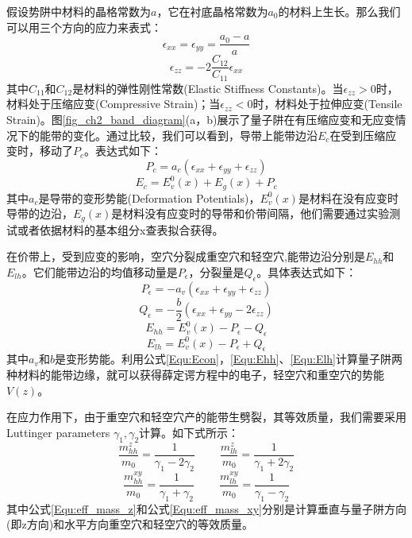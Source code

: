 假设势阱中材料的晶格常数为$a$，它在衬底晶格常数为$a_{0}$的材料上生长。那么我们可以用三个方向的应力来表式：
\begin{equation}
\label{Equ:exx}
\epsilon_{xx} = \epsilon_{yy} = \frac{a_{0}-a}{a}
\end{equation}
\begin{equation}
\label{Equ:ezz}
\epsilon_{zz} = -2\frac{C_{12}}{C_{11}}\epsilon_{xx}
\end{equation}
其中$C_{11}$和$C_{12}$是材料的弹性刚性常数(Elastic Stiffness Constants)。当$\epsilon_{zz}>0$时，材料处于压缩应变(Compressive Strain)；当$\epsilon_{zz}<0$时，材料处于拉伸应变(Tensile Strain)。图\ref{fig_ch2_band_diagram}(a，b)展示了量子阱在有压缩应变和无应变情况下的能带的变化。通过比较，我们可以看到，导带上能带边沿$E_c$在受到压缩应变时，移动了$P_{c}$。表达式如下：
\begin{equation}
\label{Equ:Pc}
P_{c} = a_{c}(\epsilon_{xx}+\epsilon_{yy}+\epsilon_{zz})
\end{equation}
\begin{equation}
\label{Equ:Econ}
E_{c} = E_{v}^{0}(x)+E_{g}(x)+P_{c}
\end{equation}
其中$a_{c}$是导带的变形势能(Deformation Potentials)，$E_v^0(x)$是材料在没有应变时导带的边沿，$E_{g}(x)$是材料没有应变时的导带和价带间隔，他们需要通过实验测试或者依据材料的基本组分x查表拟合获得\cite{chuang1995physics,li2000material}。

在价带上，受到应变的影响，空穴分裂成重空穴和轻空穴,能带边沿分别是$E_{hh}$和$E_{lh}$。它们能带边沿的均值移动量是$P_{\epsilon}$，分裂量是$Q_{\epsilon}$。具体表达式如下：
\begin{equation}
\label{Equ:Pe}
P_{\epsilon} = -a_{v}(\epsilon_{xx}+\epsilon_{yy}+\epsilon_{zz})
\end{equation}
\begin{equation}
\label{Equ:Qe}
Q_{\epsilon} = -\frac{b}{2}(\epsilon_{xx}+\epsilon_{yy}-2\epsilon_{zz})
\end{equation}
\begin{equation}
\label{Equ:Ehh}
E_{hh} = E_{v}^{0}(x)-P_{\epsilon}-Q_{\epsilon}
\end{equation}
\begin{equation}
\label{Equ:Elh}
E_{lh} = E_{v}^{0}(x)-P_{\epsilon}+Q_{\epsilon}
\end{equation}
其中$a_{v}$和$b$是变形势能。利用公式\ref{Equ:Econ}，\ref{Equ:Ehh}、\ref{Equ:Elh}计算量子阱两种材料的能带边缘，就可以获得薛定谔方程中的电子，轻空穴和重空穴的势能$V(z)$。

在应力作用下，由于重空穴和轻空穴产的能带生劈裂，其等效质量，我们需要采用Luttinger parameters $\gamma_1, \gamma_2$计算。如下式所示：
\begin{equation}
\label{Equ:eff_mass_z}
\frac{m_{hh}^z}{m_0}=\frac{1}{\gamma_1-2\gamma_2}~~~~~~~~~~\frac{m_{lh}^z}{m_0}=\frac{1}{\gamma_1+2\gamma_2}
\end{equation}
\begin{equation}
\label{Equ:eff_mass_xy}
\frac{m_{hh}^{xy}}{m_0}=\frac{1}{\gamma_1+\gamma_2}~~~~~~~~~~\frac{m_{lh}^{xy}}{m_0}=\frac{1}{\gamma_1-\gamma_2}
\end{equation}
其中公式\ref{Equ:eff_mass_z}和公式\ref{Equ:eff_mass_xy}分别是计算垂直与量子阱方向(即z方向)和水平方向重空穴和轻空穴的等效质量\cite{eppenga1987new}。

